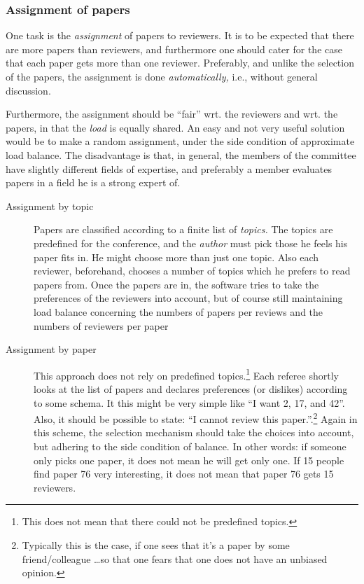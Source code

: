 \subsubsection{Assignment of papers}

One task is the \emph{assignment} of papers to reviewers. It is to be
expected that there are more papers than reviewers, and furthermore one
should cater for the case that each paper gets more than one reviewer.
Preferably, and unlike the selection of the papers, the assignment is done
\emph{automatically,} i.e., without general discussion.

Furthermore, the assignment should be ``fair'' wrt. the reviewers and wrt.
the papers, in that the \emph{load} is equally shared. An easy and not very
useful solution would be to make a random assignment, under the side
condition of approximate load balance. The disadvantage is that, in
general, the members of the committee have slightly different fields of
expertise, and preferably a member evaluates papers in a field he is a
strong expert of. %

\begin{description}
\item[Assignment by topic] Papers are classified according to a finite list
  of \emph{topics.} The topics are predefined for the conference, and the
  \emph{author} must pick those he feels his paper fits in. He might choose
  more than just one topic. Also each reviewer, beforehand, chooses a
  number of topics which he prefers to read papers from. Once the papers
  are in, the software tries to take the preferences of the reviewers into
  account, but of course still maintaining load balance concerning the
  numbers of papers per reviews and the numbers of reviewers per paper
\item[Assignment by paper] This approach does not rely on predefined
  topics.\footnote{This does not mean that there could not be predefined
    topics.} Each referee shortly looks at the list of papers and declares
  preferences (or dislikes) according to some schema. It this might be very
  simple like ``I want 2, 17, and 42''. Also, it should be possible to
  state: ``I cannot review this paper.''.\footnote{Typically this is the
    case, if one sees that it's a paper by some friend/colleague \ldots so
    that one fears that one does not have an unbiased opinion.} Again in
  this scheme, the selection mechanism should take the choices into
  account, but adhering to the side condition of balance. In other words:
  if someone only picks one paper, it does not mean he will get only one.
  If 15 people find paper 76 very interesting, it does not mean that paper
  76 gets 15 reviewers.
\end{description}


